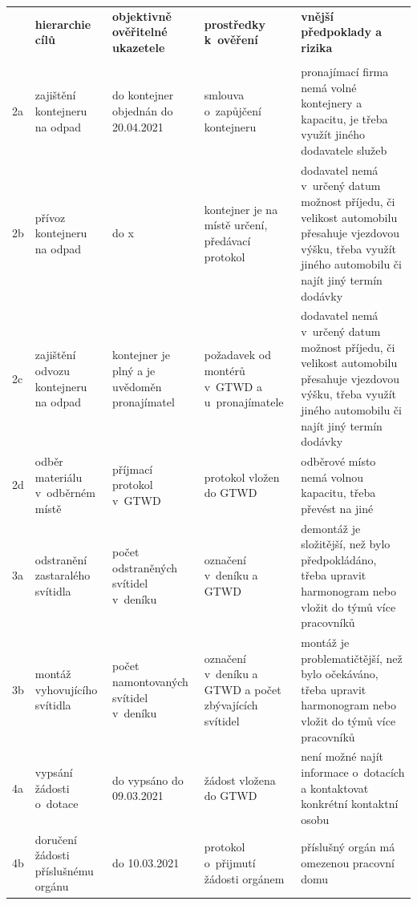 \documentclass[a4paper, twoside, 11pt]{article}
\begin{document}
		\begin{table}[H]
		\resizebox{1 \textwidth}{!}
		{
		\begin{tabular}{ !{\vrule width 2pt} p{5cm} | p{5cm} | p{5cm} | p{5cm} | p{5cm} !{\vrule width 2pt} }
	 & \textbf{hierarchie cílů} & \textbf{objektivně ověřitelné ukazetele} & \textbf{prostředky k~ověření} & \textbf{vnější předpoklady a rizika}  \\ 
	 \\ 
	2a & zajištění kontejneru na odpad & do kontejner objednán do 20.04.2021 & smlouva o~zapůjčení kontejneru & pronajímací firma nemá volné kontejnery a kapacitu, je třeba využít jiného dodavatele služeb \\ \hline
	2b & přívoz kontejneru na odpad & do x & kontejner je na místě určení, předávací protokol & dodavatel nemá v~určený datum možnost příjedu, či velikost automobilu přesahuje vjezdovou výšku, třeba využít jiného automobilu či najít jiný termín dodávky  \\ \hline
	2c & zajištění odvozu kontejneru na odpad & kontejner je plný a je uvědoměn pronajímatel & požadavek od montérů v~GTWD a u~pronajímatele & dodavatel nemá v~určený datum možnost příjedu, či velikost automobilu přesahuje vjezdovou výšku, třeba využít jiného automobilu či najít jiný termín dodávky  \\ \hline
	2d & odběr materiálu v~odběrném místě & příjmací protokol v~GTWD & protokol vložen do GTWD & odběrové místo nemá volnou kapacitu, třeba převést na jiné \\ \hline
	3a & odstranění zastaralého svítidla & počet odstraněných svítidel v~deníku & označení v~deníku a GTWD & demontáž je složitější, než bylo předpokládáno, třeba upravit harmonogram nebo vložit do týmů více pracovníků \\ \hline
	3b & montáž vyhovujícího svítidla & počet namontovaných svítidel v~deníku & označení v~deníku a GTWD a počet zbývajících svítidel & montáž je problematičtější, než bylo očekáváno, třeba upravit harmonogram nebo vložit do týmů více pracovníků   \\ \hline
	4a & vypsání žádosti o~dotace & do vypsáno do 09.03.2021 & žádost vložena do GTWD & není možné najít informace o~dotacích a kontaktovat konkrétní kontaktní osobu  \\ \hline
	4b & doručení žádosti příslušnému orgánu & do 10.03.2021 & protokol o~přijmutí žádosti orgánem & příslušný orgán má omezenou pracovní domu \\ \hline

\end{tabular}}
\end{table}
\end{document}

